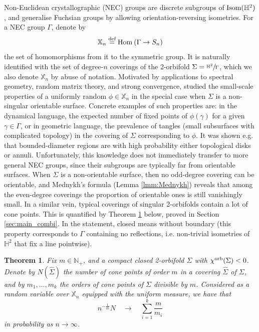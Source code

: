 \documentclass{amsart}
\newtheorem{theorem}[conjecture]{Theorem}
\newcommand{\cho}{\chi^{\textnormal{orb}}}
\newcommand{\covers}{\mathbb{X}_n}
\newcommand{\defeq}{\stackrel{\tn{def}}{=}}
\newcommand{\Hom}[3][]{\tn{Hom}_{#1}\left(#2\to #3\right)}
\newcommand{\tn}{\textnormal}
\newcommand{\whS}{{\widehat{\Sigma}}}
\begin{document}
Non-Euclidean crystallographic (NEC) groups are discrete subgroups of $\tn{Isom}(\mathbb{H}^2)$, and generalise Fuchsian groups by allowing orientation-reversing isometries. For a NEC group $\Gamma$, denote by
\begin{equation*}
\covers\defeq\Hom{\Gamma}{S_n}
\end{equation*}
the set of homomorphisms from it to the symmetric group. It is naturally identified with the set of degree-$n$ coverings of the 2-orbifold $\Sigma=\sfrac{\mathbb{H}^2}{\Gamma}$, which we also denote $\covers$ by abuse of notation. Motivated by applications to spectral geometry, random matrix theory, and strong convergence, \cite{asymptotic_stats_random_covering_surfaces_MageePuder23} studied the small-scale properties of a uniformly random $\phi\in\covers$ in the special case when $\Sigma$ is a non-singular orientable surface. Concrete examples of such properties are: in the dynamical language, the expected number of fixed points of $\phi(\gamma)$ for a given $\gamma\in\Gamma$, or in geometric language, the prevalence of tangles (small subsurfaces with complicated topology) in the covering of $\Sigma$ corresponding to $\phi$. It was shown e.g. that bounded-diameter regions are with high probability either topological disks or annuli. Unfortunately, this knowledge does not immediately transfer to more general NEC groups, since their subgroups are typically far from orientable surfaces. When $\Sigma$ is a non-orientable surface, then no odd-degree covering can be orientable, and Mednykh's formula (Lemma \ref{lmm:Mednykh}) reveals that among the even-degree coverings the proportion of orientable ones is still vanishingly small. In a similar vein, typical coverings of singular 2-orbifolds contain a lot of cone points. This is quantified by Theorem \ref{thm:cone_pt_count} below, proved in Section \ref{sec:main_combi}. In the statement, closed means without boundary (this property corresponds to $\Gamma$ containing no reflections, i.e. non-trivial isometries of $\mathbb{H}^2$ that fix a line pointwise).
\begin{theorem}\label{thm:cone_pt_count}
Fix $m\in\mathbb{N}_+$, and a compact closed 2-orbifold $\Sigma$ with $\cho(\Sigma)<0$. Denote by $N(\whS)$ the number of cone points of order $m$ in a covering $\whS$ of $\Sigma$, and by $m_1,\dots,m_k$ the orders of cone points of $\Sigma$ divisible by $m$. Considered as a random variable over $\covers$ equipped with the uniform measure, we have that
\begin{equation*}
n^{-\frac{1}{m}}N\quad\to\quad\sum_{i=1}^k\frac{m}{m_i}
\end{equation*}
in probability as $n\to\infty$.
\end{theorem}
\end{document}
